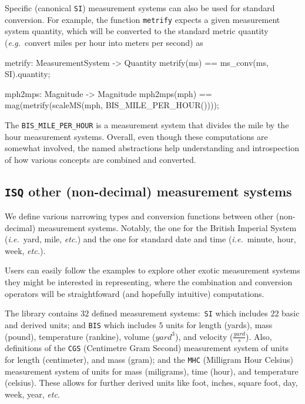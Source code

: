 \documentclass[runningheads,a4paper]{llncs}
\begin{document}
Specific (canonical \texttt{SI}) measurement systems can also be used for standard conversion. For example, the function \texttt{metrify} expects a given measurement system quantity, which will be converted to the standard metric quantity (\textit{e.g.}~convert miles per hour into meters per second) as
%
\begin{vdmsl}[frame=none,basicstyle=\ttfamily\scriptsize]
    metrify: MeasurementSystem -> Quantity
    metrify(ms) == ms_conv(ms, SI).quantity;

    mph2mps: Magnitude -> Magnitude
    mph2mps(mph) ==	mag(metrify(scaleMS(mph, BIS_MILE_PER_HOUR())));
\end{vdmsl}
%
\noindent The \texttt{BIS\_MILE\_PER\_HOUR} is a measurement system that divides the mile by the hour measurement systems. Overall, even though these computations are somewhat involved, the named abstractions help understanding and introspection of how various concepts are combined and converted.  

\subsection*{\texttt{ISQ} other (non-decimal) measurement systems}

We define various narrowing types and conversion functions between other (non-decimal) measurement systems. Notably, the one for the British Imperial System (\textit{i.e.}~yard, mile, \textit{etc.}) and the one for standard date and time (\textit{i.e.}~minute, hour, week, \textit{etc.}). 

Users can easily follow the examples to explore other exotic measurement systems they might be interested in representing, where the combination and conversion operators will be straightfoward (and hopefully intuitive) computations. 

The library contains \(32\) defined measurement systems:~\texttt{SI} which includes \(22\) basic and derived units; and \texttt{BIS} which includes \(5\) units for length (yards), mass (pound), temperature (rankine), volume (\(yard^3\)), and velocity (\(\frac{yard}{s}\)). Also, definitions of the \texttt{CGS} (Centimetre Gram Second) measurement system of units for length (centimeter), and mass (gram); and the \texttt{MHC} (Milligram Hour Celsius) measurement system of units for mass (miligrams), time (hour), and temperature (celsius). These allows for further derived units like foot, inches, square foot, day, week, year, \textit{etc}. 
\end{document}
